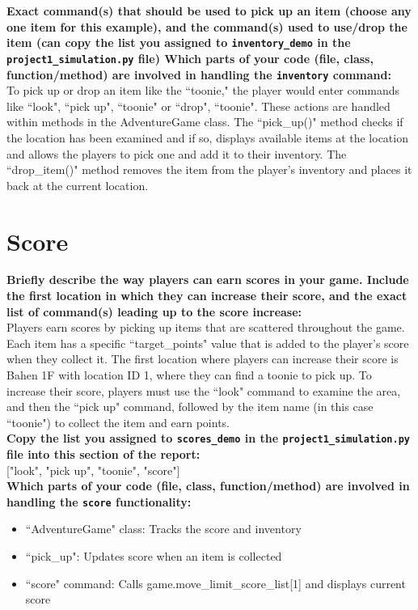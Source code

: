 \documentclass[11pt]{article}
\begin{document}
\textbf{Exact command(s) that should be used to pick up an item (choose any one item for this example), and the command(s) used to use/drop the item (can copy the list you assigned to \texttt{inventory\_demo} in the \texttt{project1\_simulation.py} file)
Which parts of your code (file, class, function/method) are involved in handling the \texttt{inventory} command: \\}
To pick up or drop an item like the ``toonie," the player would enter commands like ``look", ``pick up", ``toonie" or ``drop", ``toonie". These actions are handled within methods in the AdventureGame class. The ``pick\_up()" method checks if the location has been examined and if so, displays available items at the location and allows the players to pick one and add it to their inventory. The ``drop\_item()" method removes the item from the player's inventory and places it back at the current location.

\section*{Score}

\textbf{Briefly describe the way players can earn scores in your game. Include the first location in which they can increase their score, and the exact list of command(s) leading up to the score increase:}\\
    Players earn scores by picking up items that are scattered throughout the game. Each item has a specific ``target\_points" value that is added to the player's score when they collect it. The first location where players can increase their score is Bahen 1F with location ID 1, where they can find a toonie to pick up. To increase their score, players must use the ``look" command to examine the area, and then the ``pick up" command, followed by the item name (in this case ``toonie") to collect the item and earn points.\\


    \textbf{Copy the list you assigned to \texttt{scores\_demo} in the \texttt{project1\_simulation.py} file into this section of the report:}\\

    ["look", "pick up", "toonie", "score"]\\

   \textbf{ Which parts of your code (file, class, function/method) are involved in handling the \texttt{score} functionality:}
   \begin{itemize}
       \item ``AdventureGame" class: Tracks the score and inventory
       \item ``pick\_up": Updates score when an item is collected
       \item ``score" command: Calls game.move\_limit\_score\_list[1] and displays current score
   \end{itemize}
\end{document}
